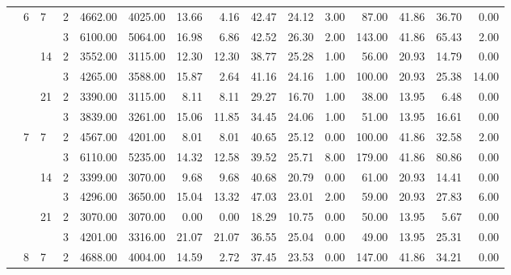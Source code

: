 \begin{tabular}{llllrrrrrrrrrrr}
              & \multirow{6}{*}{6} & \multirow{2}{*}{7} & 2 &  4662.00 &   4025.00 & 13.66 &    4.16 &   42.47 &   24.12 &    3.00 &   87.00 &   41.86 & 36.70 &     0.00 \\
              &   &    & 3 &  6100.00 &   5064.00 & 16.98 &    6.86 &   42.52 &   26.30 &    2.00 &  143.00 &   41.86 & 65.43 &     2.00 \\
\cline{3-15}
              &   & \multirow{2}{*}{14} & 2 &  3552.00 &   3115.00 & 12.30 &   12.30 &   38.77 &   25.28 &    1.00 &   56.00 &   20.93 & 14.79 &     0.00 \\
              &   &    & 3 &  4265.00 &   3588.00 & 15.87 &    2.64 &   41.16 &   24.16 &    1.00 &  100.00 &   20.93 & 25.38 &    14.00 \\
\cline{3-15}
              &   & \multirow{2}{*}{21} & 2 &  3390.00 &   3115.00 &  8.11 &    8.11 &   29.27 &   16.70 &    1.00 &   38.00 &   13.95 &  6.48 &     0.00 \\
              &   &    & 3 &  3839.00 &   3261.00 & 15.06 &   11.85 &   34.45 &   24.06 &    1.00 &   51.00 &   13.95 & 16.61 &     0.00 \\
\cline{2-15}
\cline{3-15}
              & \multirow{6}{*}{7} & \multirow{2}{*}{7} & 2 &  4567.00 &   4201.00 &  8.01 &    8.01 &   40.65 &   25.12 &    0.00 &  100.00 &   41.86 & 32.58 &     2.00 \\
              &   &    & 3 &  6110.00 &   5235.00 & 14.32 &   12.58 &   39.52 &   25.71 &    8.00 &  179.00 &   41.86 & 80.86 &     0.00 \\
\cline{3-15}
              &   & \multirow{2}{*}{14} & 2 &  3399.00 &   3070.00 &  9.68 &    9.68 &   40.68 &   20.79 &    0.00 &   61.00 &   20.93 & 14.41 &     0.00 \\
              &   &    & 3 &  4296.00 &   3650.00 & 15.04 &   13.32 &   47.03 &   23.01 &    2.00 &   59.00 &   20.93 & 27.83 &     6.00 \\
\cline{3-15}
              &   & \multirow{2}{*}{21} & 2 &  3070.00 &   3070.00 &  0.00 &    0.00 &   18.29 &   10.75 &    0.00 &   50.00 &   13.95 &  5.67 &     0.00 \\
              &   &    & 3 &  4201.00 &   3316.00 & 21.07 &   21.07 &   36.55 &   25.04 &    0.00 &   49.00 &   13.95 & 25.31 &     0.00 \\
\cline{2-15}
\cline{3-15}
              & \multirow{6}{*}{8} & \multirow{2}{*}{7} & 2 &  4688.00 &   4004.00 & 14.59 &    2.72 &   37.45 &   23.53 &    0.00 &  147.00 &   41.86 & 34.21 &     0.00 \\

\end{tabular}
